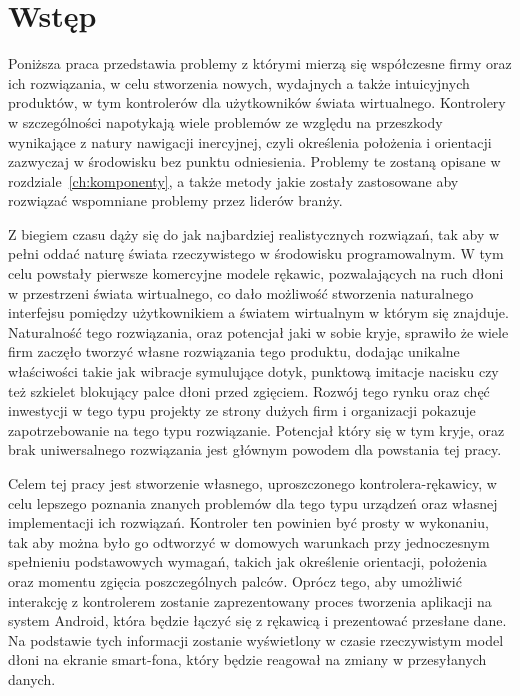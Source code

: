\chapter*{Wstęp}
\label{ch:wstep}
Poniższa praca przedstawia problemy z którymi mierzą się współczesne firmy oraz ich rozwiązania, w celu stworzenia nowych, wydajnych a także intuicyjnych produktów, w tym kontrolerów dla użytkowników świata wirtualnego. Kontrolery w szczególności napotykają wiele problemów ze względu na przeszkody wynikające z natury nawigacji inercyjnej, czyli określenia położenia i orientacji zazwyczaj w środowisku bez punktu odniesienia. Problemy te zostaną opisane w rozdziale~\ref{ch:komponenty}, a także metody jakie zostały zastosowane aby rozwiązać wspomniane problemy przez liderów branży.

Z biegiem czasu dąży się do jak najbardziej realistycznych rozwiązań, tak aby w pełni oddać naturę świata rzeczywistego w środowisku programowalnym. W tym celu powstały pierwsze komercyjne modele rękawic, pozwalających na ruch dłoni w przestrzeni świata wirtualnego, co dało możliwość stworzenia naturalnego interfejsu pomiędzy użytkownikiem a światem wirtualnym w którym się znajduje. Naturalność tego rozwiązania, oraz potencjał jaki w sobie kryje, sprawiło że wiele firm zaczęło tworzyć własne rozwiązania tego produktu, dodając unikalne właściwości takie jak wibracje symulujące dotyk, punktową imitacje nacisku czy też szkielet blokujący palce dłoni przed zgięciem. Rozwój tego rynku oraz chęć inwestycji w tego typu projekty ze strony dużych firm i organizacji pokazuje zapotrzebowanie na tego typu rozwiązanie. Potencjał który się w tym kryje, oraz brak uniwersalnego rozwiązania jest głównym powodem dla powstania tej pracy.

Celem tej pracy jest stworzenie własnego, uproszczonego kontrolera-rękawicy, w celu lepszego poznania znanych problemów dla tego typu urządzeń oraz własnej implementacji ich rozwiązań. Kontroler ten powinien być prosty w wykonaniu, tak aby można było go odtworzyć w domowych warunkach przy jednoczesnym spełnieniu podstawowych wymagań, takich jak określenie orientacji, położenia oraz momentu zgięcia poszczególnych palców. Oprócz tego, aby umożliwić interakcję z kontrolerem zostanie zaprezentowany proces tworzenia aplikacji na system Android, która będzie łączyć się z rękawicą i prezentować przesłane dane. Na podstawie tych informacji zostanie wyświetlony w czasie rzeczywistym model dłoni na ekranie smart-fona, który będzie reagował na zmiany w przesyłanych danych.